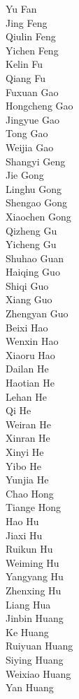 Yu Fan\\
Jing Feng\\
Qiulin Feng\\
Yichen Feng\\
Kelin Fu\\
Qiang Fu\\
Fuxuan Gao\\
Hongcheng Gao\\
Jingyue Gao\\
Tong Gao\\
Weijia Gao\\
Shangyi Geng\\
Jie Gong\\
Linghu Gong\\
Shengao Gong\\
Xiaochen Gong\\
Qizheng Gu\\
Yicheng Gu\\
Shuhao Guan\\
Haiqing Guo\\
Shiqi Guo\\
Xiang Guo\\
Zhengyan Guo\\
Beixi Hao\\
Wenxin Hao\\
Xiaoru Hao\\
Dailan He\\
Haotian He\\
Lehan He\\
Qi He\\
Weiran He\\
Xinran He\\
Xinyi He\\
Yibo He\\
Yunjia He\\
Chao Hong\\
Tiange Hong\\
Hao Hu\\
Jiaxi Hu\\
Ruikun Hu\\
Weiming Hu\\
Yangyang Hu\\
Zhenxing Hu\\
Liang Hua\\
Jinbin Huang\\
Ke Huang\\
Ruiyuan Huang\\
Siying Huang\\
Weixiao Huang\\
Yan Huang\\

